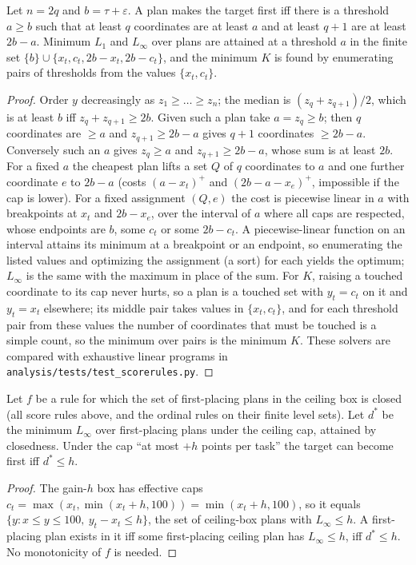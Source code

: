 \begin{proposition}\label{prop:even}
Let $n=2q$ and $b=\tau+\varepsilon$. A plan makes the target first iff there is a threshold $a\ge b$ such that at least $q$ coordinates are at least $a$ and at least $q+1$ are at least $2b-a$. Minimum $L_1$ and $L_\infty$ over plans are attained at a threshold $a$ in the finite set $\{b\}\cup\{x_t,c_t,2b-x_t,2b-c_t\}$, and the minimum $K$ is found by enumerating pairs of thresholds from the values $\{x_t,c_t\}$.
\end{proposition}
\begin{proof}
Order $y$ decreasingly as $z_1\ge\dots\ge z_n$; the median is $(z_q+z_{q+1})/2$, which is at least $b$ iff $z_q+z_{q+1}\ge2b$. Given such a plan take $a=z_q\ge b$; then $q$ coordinates are $\ge a$ and $z_{q+1}\ge2b-a$ gives $q+1$ coordinates $\ge2b-a$. Conversely such an $a$ gives $z_q\ge a$ and $z_{q+1}\ge2b-a$, whose sum is at least $2b$. For a fixed $a$ the cheapest plan lifts a set $Q$ of $q$ coordinates to $a$ and one further coordinate $e$ to $2b-a$ (costs $(a-x_t)^+$ and $(2b-a-x_e)^+$, impossible if the cap is lower). For a fixed assignment $(Q,e)$ the cost is piecewise linear in $a$ with breakpoints at $x_t$ and $2b-x_e$, over the interval of $a$ where all caps are respected, whose endpoints are $b$, some $c_t$ or some $2b-c_t$. A piecewise-linear function on an interval attains its minimum at a breakpoint or an endpoint, so enumerating the listed values and optimizing the assignment (a sort) for each yields the optimum; $L_\infty$ is the same with the maximum in place of the sum. For $K$, raising a touched coordinate to its cap never hurts, so a plan is a touched set with $y_t=c_t$ on it and $y_t=x_t$ elsewhere; its middle pair takes values in $\{x_t,c_t\}$, and for each threshold pair from these values the number of coordinates that must be touched is a simple count, so the minimum over pairs is the minimum $K$. These solvers are compared with exhaustive linear programs in \texttt{analysis/tests/test\_scorerules.py}.
\end{proof}

\begin{proposition}\label{prop:cap}
Let $f$ be a rule for which the set of first-placing plans in the ceiling box is closed (all score rules above, and the ordinal rules on their finite level sets). Let $d^\ast$ be the minimum $L_\infty$ over first-placing plans under the ceiling cap, attained by closedness. Under the cap ``at most $+h$ points per task'' the target can become first iff $d^\ast\le h$.
\end{proposition}
\begin{proof}
The gain-$h$ box has effective caps $c_t=\max(x_t,\min(x_t+h,100))=\min(x_t+h,100)$, so it equals $\{y:x\le y\le100,\ y_t-x_t\le h\}$, the set of ceiling-box plans with $L_\infty\le h$. A first-placing plan exists in it iff some first-placing ceiling plan has $L_\infty\le h$, iff $d^\ast\le h$. No monotonicity of $f$ is needed.
\end{proof}

